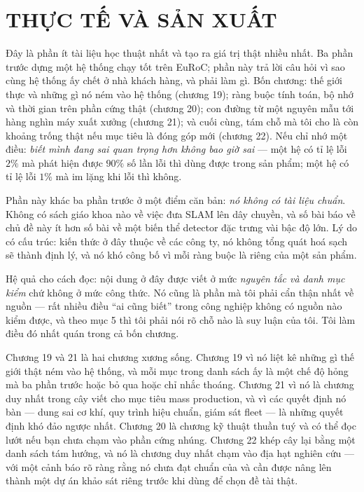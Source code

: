 \documentclass[../vslam.tex]{subfiles}
\begin{document}
\part{THỰC TẾ VÀ SẢN XUẤT}
\begin{tomtat}
Đây là phần ít tài liệu học thuật nhất và tạo ra giá trị thật nhiều nhất. Ba phần trước dựng một hệ thống chạy tốt trên EuRoC; phần này trả lời câu hỏi vì sao cùng hệ thống ấy chết ở nhà khách hàng, và phải làm gì. Bốn chương: thế giới thực và những gì nó ném vào hệ thống (chương 19); ràng buộc tính toán, bộ nhớ và thời gian trên phần cứng thật (chương 20); con đường từ một nguyên mẫu tới hàng nghìn máy xuất xưởng (chương 21); và cuối cùng, tám chỗ mà tôi cho là còn khoảng trống thật nếu mục tiêu là đóng góp mới (chương 22). Nếu chỉ nhớ một điều: \emph{biết mình đang sai quan trọng hơn không bao giờ sai} --- một hệ có tỉ lệ lỗi \(2\%\) mà phát hiện được \(90\%\) số lần lỗi thì dùng được trong sản phẩm; một hệ có tỉ lệ lỗi \(1\%\) mà im lặng khi lỗi thì không.
\end{tomtat}

Phần này khác ba phần trước ở một điểm căn bản: \emph{nó không có tài liệu chuẩn}. Không có sách giáo khoa nào về việc đưa SLAM lên dây chuyền, và số bài báo về chủ đề này ít hơn số bài về một biến thể detector đặc trưng vài bậc độ lớn. Lý do có cấu trúc: kiến thức ở đây thuộc về các công ty, nó không tổng quát hoá sạch sẽ thành định lý, và nó khó công bố vì mỗi ràng buộc là riêng của một sản phẩm.

Hệ quả cho cách đọc: nội dung ở đây được viết ở mức \emph{nguyên tắc và danh mục kiểm} chứ không ở mức công thức. Nó cũng là phần mà tôi phải cẩn thận nhất về nguồn --- rất nhiều điều ``ai cũng biết'' trong công nghiệp không có nguồn nào kiểm được, và theo  mục 5 thì tôi phải nói rõ chỗ nào là suy luận của tôi. Tôi làm điều đó nhất quán trong cả bốn chương.

Chương 19 và 21 là hai chương xương sống. Chương 19 vì nó liệt kê những gì thế giới thật ném vào hệ thống, và mỗi mục trong danh sách ấy là một chế độ hỏng mà ba phần trước hoặc bỏ qua hoặc chỉ nhắc thoáng. Chương 21 vì nó là chương duy nhất trong cây viết cho mục tiêu mass production, và vì các quyết định nó bàn --- dung sai cơ khí, quy trình hiệu chuẩn, giám sát fleet --- là những quyết định khó đảo ngược nhất. Chương 20 là chương kỹ thuật thuần tuý và có thể đọc lướt nếu bạn chưa chạm vào phần cứng nhúng. Chương 22 khép cây lại bằng một danh sách tám hướng, và nó là chương duy nhất chạm vào địa hạt nghiên cứu --- với một cảnh báo rõ ràng rằng nó chưa đạt chuẩn của  và cần được nâng lên thành một dự án khảo sát riêng trước khi dùng để chọn đề tài thật.





\ifSubfilesClassLoaded{\printbibliography[title={Nguồn}]}{}
\end{document}
